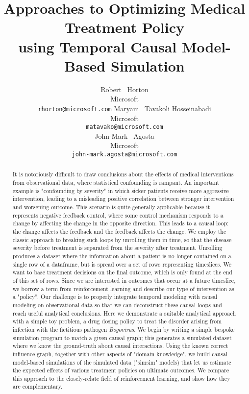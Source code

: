 \documentclass{article}
\title{Approaches to Optimizing Medical Treatment Policy\\ using Temporal Causal Model-Based Simulation}
\author{%
  Robert ~Horton\\ 
  Microsoft\\ 
  \texttt{rhorton@microsoft.com}
  \And
  Maryam ~Tavakoli Hosseinabadi \\
  Microsoft \\
  \texttt{matavako@microsoft.com} \\
  \And
  John-Mark ~Agosta \\
  Microsoft \\
  \texttt{john-mark.agosta@microsoft.com} \\
}
\begin{document}
\maketitle

\begin{abstract}

It is notoriously difficult to draw conclusions about the effects of medical interventions from observational data, where statistical confounding is rampant. An important example is "confounding by severity" in which sicker patients receive more aggressive intervention, leading to a misleading positive correlation between stronger intervention and worsening outcome. This scenario is quite generally applicable because it represents negative feedback control, where some control mechanism responds to a change by affecting the change in the opposite direction. This leads to a causal loop: the change affects the feedback and the feedback affects the change. We employ the classic approach to breaking such loops by unrolling them in time, so that the disease severity before treatment is separated from the severity after treatment. Unrolling produces a dataset where the information about a patient is no longer contained on a single row of a dataframe, but is spread over a set of rows representing timeslices. We want to base treatment decisions on the final outcome, which is only found at the end of this set of rows. Since we are interested in outcomes that occur at a future timeslice, we borrow a term from reinforcement learning and describe our type of intervention as a "policy". Our challenge is to properly integrate temporal modeling with causal modeling on observational data so that we can deconstruct these causal loops and reach useful analytical conclusions. Here we demonstrate a suitable analytical approach with a simple toy problem, a drug dosing policy to treat the disorder arising from infection with the fictitious pathogen \textit{Bogovirus}. We begin by writing a simple bespoke simulation program to match a given causal graph; this generates a simulated dataset where we know the ground-truth about causal interactions. Using the known correct influence graph, together with other aspects of "domain knowledge", we build causal model-based simulations of the simulated data ("simsim" models) that let us estimate the expected effects of various treatment policies on ultimate outcomes. We compare this approach to the closely-relate field of reinforcement learning, and show how they are complementary.

\end{abstract}
\end{document}
